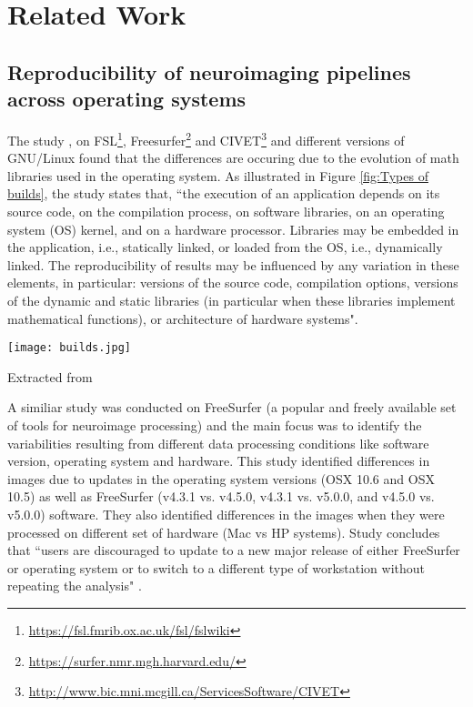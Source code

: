 \chapter{Related Work}

\section{Reproducibility of neuroimaging pipelines across operating systems}

The study \cite{Gla15}, on FSL\footnote{\url{https://fsl.fmrib.ox.ac.uk/fsl/fslwiki}}, Freesurfer\footnote{\url{https://surfer.nmr.mgh.harvard.edu/}} and CIVET\footnote{\url{http://www.bic.mni.mcgill.ca/ServicesSoftware/CIVET}} and different versions of GNU/Linux found that the differences are occuring due to the evolution of math libraries used in the operating system. As illustrated in Figure \ref{fig:Types of builds}, the study \cite{Gla15} states that, ``the execution of an application depends on its source code, on the compilation process, on software libraries, on an operating system (OS) kernel, and on a hardware processor. Libraries may be embedded in the application, i.e., statically linked, or loaded from the OS, i.e., dynamically linked. The reproducibility of results may be influenced by any variation in these elements, in particular: versions of the source code, compilation options, versions of the dynamic and static libraries (in particular when these libraries implement mathematical functions), or architecture of hardware systems".

\begin{center}
\texttt{[image: builds.jpg]}
\label{fig:Types of builds}
\caption*{Extracted from \cite{Gla15}}
\end{center}

A similiar study \cite{10.1371/journal.pone.0038234} was conducted on FreeSurfer (a popular and freely available set of tools for neuroimage processing) and the main focus was to identify the variabilities resulting from different data processing conditions like software version, operating system and hardware. This study identified differences in images due to updates in the operating system versions (OSX 10.6 and OSX 10.5) as well as FreeSurfer (v4.3.1 vs. v4.5.0, v4.3.1 vs. v5.0.0, and v4.5.0 vs. v5.0.0) software. They also identified differences in the images when they were processed on different set of hardware (Mac vs HP systems). Study concludes that ``users are discouraged to update to a new major release of either FreeSurfer or operating system or to switch to a different type of workstation without repeating the analysis" \cite{10.1371/journal.pone.0038234}.

